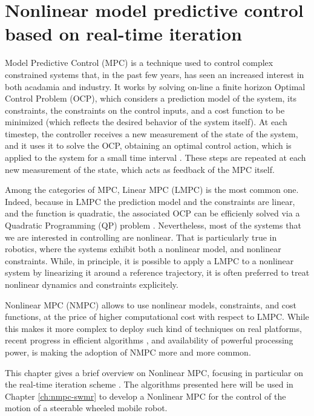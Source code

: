 \chapter{Nonlinear model predictive control based on real-time iteration}
\label{ch:nmpc-rti}
Model Predictive Control (MPC) is a technique used to control complex 
constrained systems that, in the past few years, has seen an increased
interest in both acadamia and industry. It works by solving on-line a
finite horizon Optimal Control Problem (OCP), which considers a prediction 
model of the system, its constraints, the constraints on the
control inputs, and a cost function to be minimized (which reflects the
desired behavior of the system itself).
At each timestep, the controller receives a new measurement of the state of 
the system, and it uses it to solve the OCP, obtaining an optimal control action,
which is applied to the system for a small time interval
\cite{Mayne2014MPCAutomatica}. These steps are repeated at each new measurement 
of the state, which acts as feedback of the MPC itself.

Among the categories of MPC, Linear MPC (LMPC) is the most common one.
Indeed, because in LMPC the prediction model and the constraints are linear,
and the function is quadratic, the associated OCP can be efficienly solved
via a Quadratic Programming (QP) problem \cite{Gros2020Fromlineartononlinear}. 
Nevertheless, most of the systems that we are interested in controlling are 
nonlinear. That is particularly true in robotics, where the systems exhibit
both a nonlinear model, and nonlinear constraints. While, in principle, it is 
possible to apply a LMPC to a nonlinear system by linearizing it around a 
reference trajectory, it is often preferred to treat nonlinear dynamics and 
constraints explicitely.

Nonlinear MPC (NMPC) \cite{Diehl2009EfficientNumericalMethodsNMPC} allows to use 
nonlinear models, constraints, and cost functions, at the price of higher 
computational cost with respect to LMPC. While this makes it more complex to 
deploy such kind of techniques on real platforms, recent progress in efficient
algorithms \cite{Diehl2005RTI}, and availability of powerful processing power,
is making the adoption of NMPC more and more common.

This chapter gives a brief overview on Nonlinear MPC, focusing in particular on
the real-time iteration scheme \cite{Gros2020Fromlineartononlinear}. The 
algorithms presented here will be used in Chapter \ref{ch:nmpc-swmr} to develop 
a Nonlinear MPC for the control of the motion of a steerable wheeled mobile 
robot.

